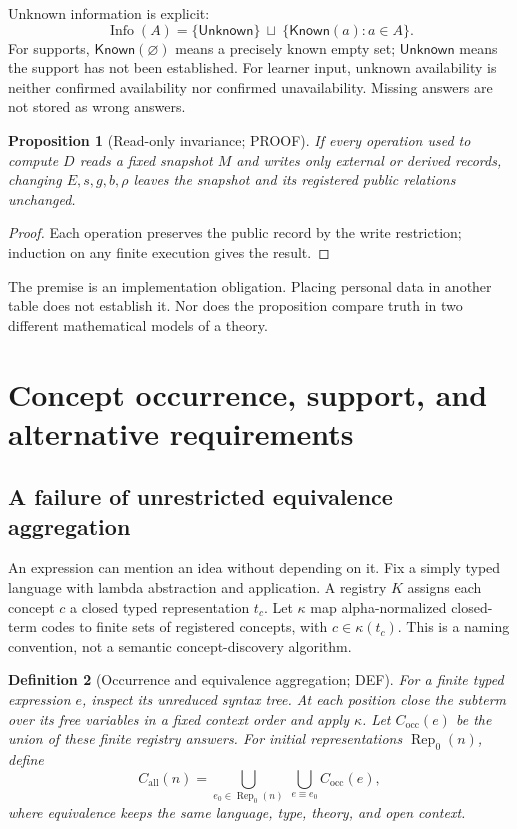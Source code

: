 \documentclass[11pt,a4paper]{article}
\newtheorem{definition}{Definition}[section]
\newtheorem{proposition}[definition]{Proposition}
\theoremstyle{remark}
\newcommand{\Known}{\mathsf{Known}}
\newcommand{\Unknown}{\mathsf{Unknown}}
\newcommand{\Occ}{C_{\mathrm{occ}}}
\newcommand{\All}{C_{\mathrm{all}}}
\newcommand{\status}[1]{\textsf{\small #1}}
\begin{document}
Unknown information is explicit:
\[
 \operatorname{Info}(A)=\{\Unknown\}\ \sqcup\
 \{\Known(a):a\in A\}.
\]
For supports, \(\Known(\varnothing)\) means a precisely known empty set;
\(\Unknown\) means the support has not been established. For learner input,
unknown availability is neither confirmed availability nor confirmed
unavailability. Missing answers are not stored as wrong answers.

\begin{proposition}[Read-only invariance; \status{PROOF}]\label{prop:readonly}
If every operation used to compute \(D\) reads a fixed snapshot \(M\) and writes
only external or derived records, changing \(E,s,g,b,\rho\) leaves the snapshot
and its registered public relations unchanged.
\end{proposition}
\begin{proof}
Each operation preserves the public record by the write restriction;
induction on any finite execution gives the result.
\end{proof}
The premise is an implementation obligation. Placing personal data
in another table does not establish it. Nor does the proposition compare
truth in two different mathematical models of a theory.

\section{Concept occurrence, support, and alternative requirements}
\label{sec:requirements}
\subsection{A failure of unrestricted equivalence aggregation}
An expression can mention an idea without depending on it. Fix a simply typed
language with lambda abstraction and application. A registry \(K\) assigns each
concept \(c\) a closed typed representation \(t_c\). Let \(\kappa\) map
alpha-normalized closed-term codes to finite sets of registered concepts,
with \(c\in\kappa(t_c)\). This is a naming convention, not a semantic
concept-discovery algorithm.

\begin{definition}[Occurrence and equivalence aggregation; \status{DEF}]
For a finite typed expression \(e\), inspect its unreduced syntax tree.
At each position close the subterm over its free variables in a fixed
context order and apply \(\kappa\). Let \(\Occ(e)\) be the union of these
finite registry answers. For initial representations \(\operatorname{Rep}_0(n)\),
define
\[
 \All(n)=\bigcup_{e_0\in\operatorname{Rep}_0(n)}
                 \ \bigcup_{e\equiv e_0}\Occ(e),
\]
where equivalence keeps the same language, type, theory, and open context.
\end{definition}
\end{document}
